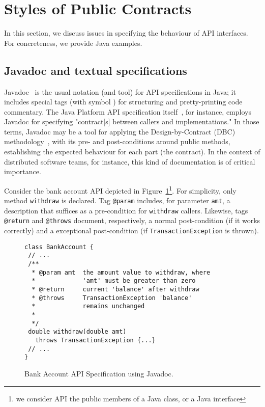 \section{Styles of Public Contracts}
\label{sec:example}

In this section, we discuss issues in specifying the behaviour of API interfaces. For concreteness, we provide Java examples.

\subsection{Javadoc and textual specifications}

Javadoc~\cite{javadoc-oracle} is the usual notation (and tool) for API specifications in Java; it includes special tags (with symbol \@) for structuring and pretty-printing code commentary.
The Java Platform API specification itself~\cite{java-spec}, for instance, employs Javadoc for specifying "contract[s] between callers and implementations."
In those terms, Javadoc may be a tool for applying the Design-by-Contract (DBC) methodology~\cite{dbc}, with its pre- and post-conditions around public methods, establishing the expected behaviour for each part (the contract). In the context of distributed software teams, for instance, this kind of documentation is of critical importance. 


Consider the bank account API depicted in Figure~\ref{Fig-Javadoc-Bank}\footnote{we consider API the public members of a Java class, or a Java interface}. For simplicity, only method {\lstinline!withdraw!} is declared. Tag \lstinline!@param! includes, for parameter \lstinline!amt!, a description that suffices as a pre-condition for \lstinline!withdraw! callers. Likewise, tags \lstinline!@return! and \lstinline!@throws! document, respectively, a normal post-condition (if it works correctly) and a exceptional post-condition (if \lstinline!TransactionException! is thrown).


\begin{figure}
\centering
\begin{lstlisting}[basicstyle=\footnotesize\ttfamily,name=figxpi]
class BankAccount {
 // ...
 /**
  * @param amt  the amount value to withdraw, where
  *             'amt' must be greater than zero 
  * @return     current 'balance' after withdraw
  * @throws     TransactionException 'balance' 
  *             remains unchanged
  *
  */
 double withdraw(double amt) 
   throws TransactionException {...}
 // ...
}
\end{lstlisting}
\caption{Bank Account API Specification using Javadoc.}
\label{Fig-Javadoc-Bank}
\end{figure}


